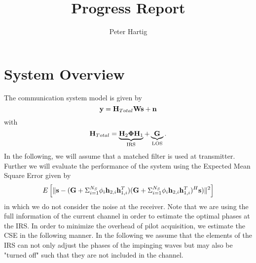 \documentclass[12pt,a4paper]{report}
\title{Progress Report}
\author{Peter Hartig}
\begin{document}
\maketitle
\tableofcontents
\section{System Overview}
The communication system model is given by 
\begin{equation}
\mathbf{y} = \mathbf{H}_{Total} \mathbf{W} \mathbf{s}  + \mathbf{n}
\end{equation}
with 
	\begin{equation*}
	\mathbf{H}_{Total} = \underbrace{\mathbf{H}_{2}\boldsymbol{\Phi}\mathbf{H}_{1}}_{\text{IRS}} + \underbrace{\mathbf{G}}_{\text{LOS}}.
	\end{equation*}
In the following, we will assume that a matched filter is used at transmitter. Further we will evaluate the performance of the system using the Expected Mean Square Error given by 
\begin{equation}
E\left[\|  \mathbf{s} - (\mathbf{G} + \Sigma_{i=1}^{N_S} \phi_i \mathbf{h}_{2,i}\mathbf{h}^T_{1,i})(\mathbf{G} + \Sigma_{i=1}^{N_S} \phi_i \mathbf{h}_{2,i}\mathbf{h}^T_{1,i})^H\mathbf{s}) \|^2 \right]
\end{equation}
in which we do not consider the noise at the receiver. 
Note that we are using the full information of the current channel in order to estimate the optimal phases at the IRS. 
In order to minimize the overhead of pilot acquisition, we estimate the CSE in the following manner. In the following we assume that the elements of the IRS can not only adjust the phases of the impinging waves but may also be "turned off" such that they are not included in the channel.
\end{document}
